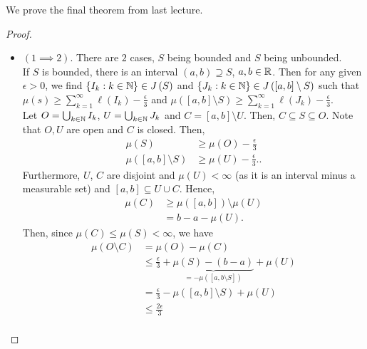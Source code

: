 We prove the final theorem from last lecture.
\begin{proof}
	\begin{itemize}
		\item \(\left( 1 \implies 2 \right) \). There are \(2\) cases, \(S\) being bounded and \(S\) being unbounded.\\
			If \(S\) is bounded, there is an interval \(\left( a, b \right) \supseteq S\), \(a, b \in \mathbb{R}\). Then for any given \(\epsilon > 0\), we find \(\{I_{k} : k \in \mathbb{N}\} \in J\left( S \right)  \) and \(\{J_{k} : k \in \mathbb{N}\}  \in J\left( \left[ a, b \right] \setminus S \right) \) such that \( \mu \left( s \right) \ge \sum_{k=1}^{\infty} \ell\left( I_{k} \right)  - \frac{\epsilon}{3}\) and \( \mu\left( \left[ a, b \right] \setminus S \right)  \ge \sum_{k=1}^{\infty} \ell \left( J_{k} \right) - \frac{\epsilon}{3}\).\\
			Let \(O = \bigcup_{k \in \mathbb{N}} I_{k}\), \(U = \bigcup_{k \in \mathbb{N}} J_{k} \) and \(C = \left[ a, b \right] \setminus U\). Then, \(C  \subseteq S \subseteq O\). Note that \(O, U\) are open and \(C\) is closed. Then, \begin{align*}
				\mu \left( S \right) &\ge \mu\left( O \right) -\frac{\epsilon}{3}\\
				\mu\left( \left[ a, b \right] \setminus S \right) &\ge \mu\left( U \right) - \frac{\epsilon}{3}.
			.
		\end{align*}
		Furthermore, \(U\), \(C\) are disjoint and \(\mu\left( U \right) < \infty\) (as it is an interval minus a measurable set) and \(\left[ a, b \right] \subseteq U \cup C\). Hence,
		\begin{align*}
			\mu\left( C \right) &\ge \mu \left( \left[ a, b \right]  \right)  \setminus \mu \left( U \right) \\
					    &= b - a - \mu\left( U \right)
		.\end{align*}
		Then, since \( \mu\left( C \right) \le \mu\left( S \right)  < \infty\), we have \begin{align*}
			\mu\left( O \setminus C \right) &=  \mu\left( O \right) - \mu\left( C \right)  \\
							&\le \frac{\epsilon}{3} + \underbrace{\mu\left( S \right) - \left( b - a \right)}_{= -\mu\left( \left[ a, b \setminus S \right]  \right) }  + \mu \left( U \right) \\
							&=  \frac{\epsilon}{3}- \mu\left( \left[ a, b \right] \setminus S \right)  + \mu\left( U \right)  \\
							&\le \frac{2\epsilon}{3} \\

\end{align*}
\end{itemize}
\end{proof}
